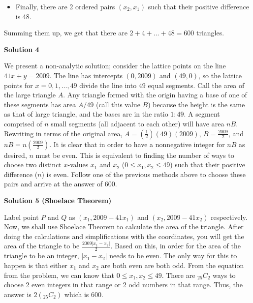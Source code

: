 \begin{enumerate}
 
            \begin{itemize}
        \item Finally, there are 2 ordered pairs $(x_2,x_1)$ such that their positive difference is 48.
            \end{itemize}
            Summing them up, we get that there are $2+4+\dots + 48 = \boxed{600}$ triangles.

 



\textbf{Solution 4}

We present a non-analytic solution; consider the lattice points on the line $41x+y=2009$. The line has intercepts $(0, 2009)$ and $(49, 0)$, so the lattice points for $x=0, 1, \ldots, 49$ divide the line into $49$ equal segments. Call the area of the large triangle $A$. Any triangle formed with the origin having a base of one of these segments has area $A/49$ (call this value $B$) because the height is the same as that of large triangle, and the bases are in the ratio $1:49$. A segment comprised of $n$ small segments (all adjacent to each other) will have area $nB$. Rewriting in terms of the original area, $A=(\frac{1}{2})(49)(2009)$, $B=\frac{2009}{2}$, and $nB=n(\frac{2009}{2})$. It is clear that in order to have a nonnegative integer for $nB$ as desired, $n$ must be even. This is equivalent to finding the number of ways to choose two distinct $x$-values $x_1$ and $x_2$ ($0 \leq x_1, x_2 \leq 49$) such that their positive difference ($n$) is even. Follow one of the previous methods above to choose these pairs and arrive at the answer of 600.

 



\textbf{Solution 5 (Shoelace Theorem)}

Label point $P$ and $Q$ as $(x_1, 2009 - 41x_1)$ and $(x_2, 2009 - 41x_2)$ respectively. Now, we shall use Shoelace Theorem to calculate the area of the triangle. After doing the calculations and simplifications with the coordinates, you will get the area of the triangle to be $\frac{2009|x_1-x_2|}{2}$. Based on this, in order for the area of the triangle to be an integer, $|x_1-x_2|$ needs to be even. The only way for this to happen is that either $x_1$ and $x_2$ are both even are both odd. From the equation from the problem, we can know that $0 \le x_1, x_2 \le 49$. There are $_{25}C_2$ ways to choose 2 even integers in that range or 2 odd numbers in that range. Thus, the answer is $2(_{25}C_2)$ which is $\boxed{600}$.

 




\end{enumerate}
